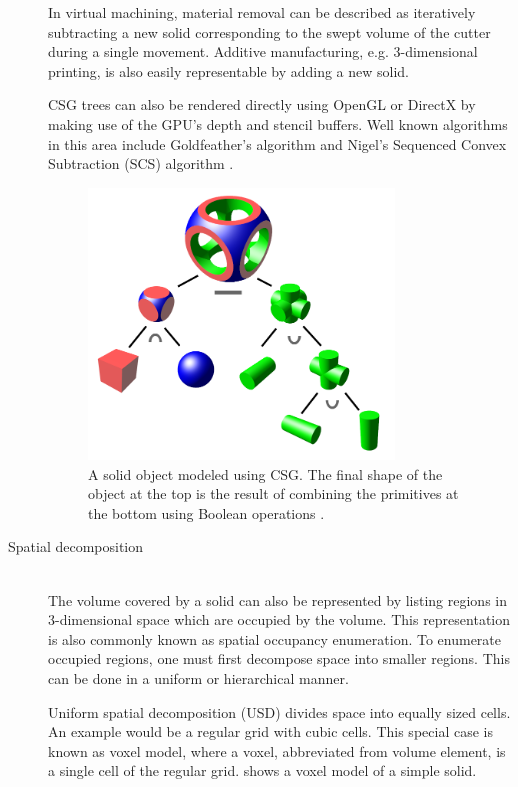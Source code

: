 \begin{description}
	In virtual machining, material removal can be described as iteratively subtracting a new solid corresponding to the swept volume of the cutter during a single movement.
	Additive manufacturing, e.g. 3-dimensional printing, is also easily representable by adding a new solid.

	CSG trees can also be rendered directly using OpenGL or DirectX by making use of the GPU's depth and stencil buffers.
	Well known algorithms in this area include Goldfeather's algorithm \cite{goldfeather} and Nigel's Sequenced Convex Subtraction (SCS) algorithm \cite{scs}.

	\begin{figure}[H]
		\centering
		\includegraphics[width=0.8\textwidth]{images/csg_tree}
		\caption[CSG tree]{
			A solid object modeled using CSG.
			The final shape of the object at the top is the result of combining the primitives at the bottom using Boolean operations \cite{csg_tree}.
		}
		\label{fig:csg_tree}
	\end{figure}

	\item[Spatial decomposition] \hfill \\
	The volume covered by a solid can also be represented by listing regions in 3-dimensional space which are occupied by the volume.
	This representation is also commonly known as spatial occupancy enumeration.
	To enumerate occupied regions, one must first decompose space into smaller regions.
	This can be done in a uniform or hierarchical manner.

	Uniform spatial decomposition (USD) divides space into equally sized cells.
	An example would be a regular grid with cubic cells.
	This special case is known as voxel model, where a voxel, abbreviated from volume element, is a single cell of the regular grid.
	 shows a voxel model of a simple solid.


\end{description}
